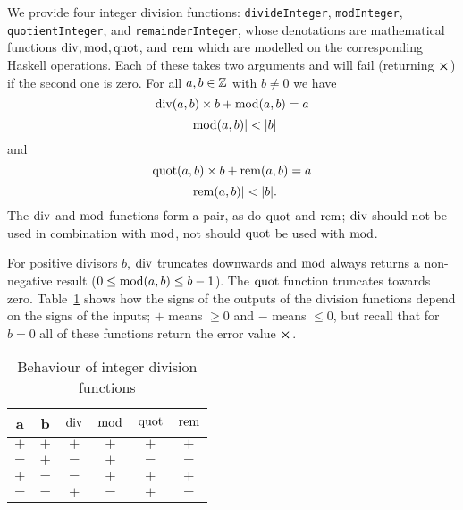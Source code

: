 
\label{note:integer-division-functions}
We provide four integer division functions: \texttt{divideInteger},
\texttt{modInteger}, \texttt{quotientInteger}, and \texttt{remainderInteger},
whose denotations are mathematical functions $\operatorname{div}, \operatorname{mod}, \operatorname{quot}$, and
$\operatorname{rem}$ which are modelled on the corresponding Haskell operations. Each of
these takes two arguments and will fail (returning $\errorX$) if the second one
is zero.  For all $a,b \in \mathbb{Z}$ with $b \ne 0$ we have
$$
\operatorname{div}(a,b) \times b + \operatorname{mod}(a,b) = a
$$
$$
  |\operatorname{mod}(a,b)| < |b|
$$\noindent and
$$
  \operatorname{quot}(a,b) \times b + \operatorname{rem}(a,b) = a
$$
$$
  |\operatorname{rem}(a,b)| < |b|.
$$
\noindent The $\operatorname{div}$ and $\operatorname{mod}$ functions form a pair, as do $\operatorname{quot}$ and $\operatorname{rem}$;
$\operatorname{div}$ should not be used in combination with $\operatorname{mod}$, not should $\operatorname{quot}$ be used
with $\operatorname{mod}$.

For positive divisors $b$, $\operatorname{div}$ truncates downwards and $\operatorname{mod}$ always
returns a non-negative result ($0 \leq \operatorname{mod}(a,b) \leq b-1$).  The $\operatorname{quot}$
function truncates towards zero.  Table~\ref{table:integer-division-signs} shows
how the signs of the outputs of the division functions depend on the signs of
the inputs; $+$ means $\geq 0$ and $-$ means $\leq 0$, but recall that for $b=0$
all of these functions return the error value $\errorX$.
\begin{table}[H]
  \centering
    \begin{tabular}{|cc|cc|cc|}
        \hline
        a & b & $\operatorname{div}$ & $\operatorname{mod}$ & $\operatorname{quot}$ & $\operatorname{rem}$ \\
        \hline
        $+$ & $+$ & $+$ & $+$ & $+$ & $+$ \\
        $-$ & $+$ & $-$ & $+$ & $-$ & $-$ \\
        $+$ & $-$ & $-$ & $+$ & $+$ & $+$ \\
        $-$ & $-$ & $+$ & $-$ & $+$ & $-$ \\
        \hline
        \end{tabular}
   \caption{Behaviour of integer division functions}
   \label{table:integer-division-signs}
\end{table}

